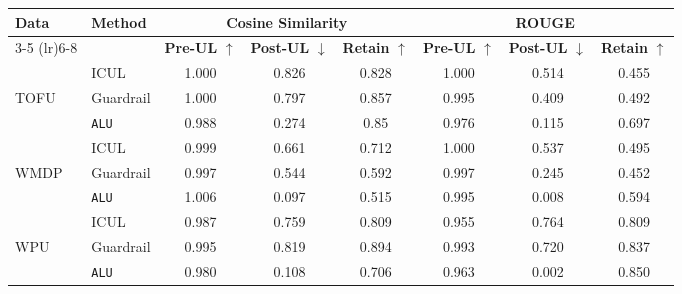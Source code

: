 \begin{table*}[]
    \centering
    \caption{Comparison of Methods using Cosine Similarity and ROUGE Metrics with Qwen2.5-3B Instruct}
    \begin{tabular}{llccc|ccc}
        \toprule
        \textbf{Data}&\textbf{Method} & \multicolumn{3}{c}{\textbf{Cosine Similarity}} & \multicolumn{3}{c}{\textbf{ROUGE}} \\
        \cmidrule(lr){3-5} \cmidrule(lr){6-8}
         & & \textbf{Pre-UL} $\uparrow$ & \textbf{Post-UL} $\downarrow$ & \textbf{Retain} $\uparrow$ & \textbf{Pre-UL} $\uparrow$ & \textbf{Post-UL} $\downarrow$ & \textbf{Retain} $\uparrow$ \\
        \midrule
        &ICUL & 1.000 & 0.826 & 0.828 & 1.000 & 0.514 & 0.455 \\
        TOFU &Guardrail & 1.000 & 0.797 & 0.857 & 0.995 & 0.409 & 0.492 \\
        &\texttt{ALU}  & 0.988 & 0.274 & 0.85 & 0.976 & 0.115 & 0.697 \\
        \midrule
        &ICUL  & 0.999 & 0.661 & 0.712 & 1.000 & 0.537 & 0.495 \\
        WMDP & Guardrail  & 0.997 & 0.544 & 0.592 & 0.997 & 0.245 & 0.452 \\
        &\texttt{ALU} & 1.006 & 0.097 & 0.515 & 0.995 & 0.008 & 0.594 \\
        \midrule
        &ICUL  & 0.987 & 0.759 & 0.809 & 0.955 & 0.764 & 0.809 \\
        WPU &Guardrail & 0.995 & 0.819 & 0.894 & 0.993 & 0.720 & 0.837 \\
        &\texttt{ALU} & 0.980 & 0.108 & 0.706 & 0.963 & 0.002 & 0.850 \\
        
        \bottomrule
    \end{tabular}
\label{tab:t27}    
\end{table*}

